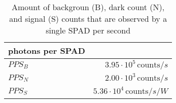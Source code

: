 \begin{table}[H]
\centering
\caption{Amount of backgroun (B), dark count (N), and signal (S) counts that are observed by a single SPAD per second}
\label{tab:photons_per_SPAD}
\begin{tabular}{|l|r|}\hline
    \textbf{photons per SPAD} & \\
    \hline 
    $PPS_B$ & $3.95\cdot10^{5}\, \text{counts}/s$ \\
    $PPS_N$ & $2.00\cdot10^{3}\, \text{counts}/s$ \\
    $PPS_S$ & $5.36\cdot10^{4}\, \text{counts}/s/W$ \\
    \hline 
\end{tabular}
\end{table}
